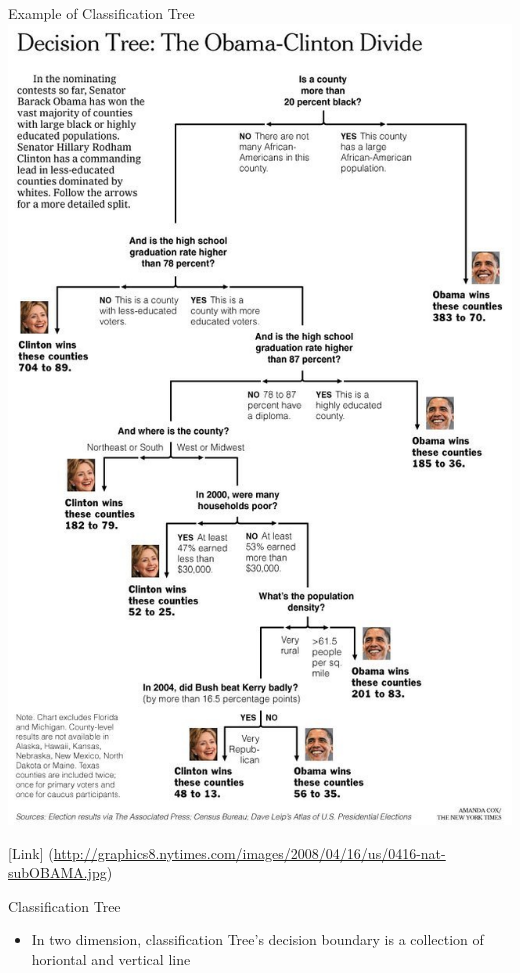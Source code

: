 \documentclass[
  ignorenonframetext,
]{beamer}
\providecommand{\tightlist}{%
  \setlength{\itemsep}{0pt}\setlength{\parskip}{0pt}}
\begin{document}
\begin{frame}{Example of Classification Tree}
\label{example-of-classification-tree}
\includegraphics{images/tree2.jpg}

{[}Link{]}
(\url{http://graphics8.nytimes.com/images/2008/04/16/us/0416-nat-subOBAMA.jpg})
\end{frame}

\begin{frame}{Classification Tree}
\label{classification-tree}
\begin{itemize}
\tightlist
\item
  In two dimension, classification Tree's decision boundary is a
  collection of horiontal and vertical line
\end{itemize}
\end{frame}
\end{document}
